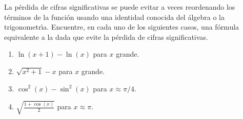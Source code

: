 \begin{enunciado}
 La p\'erdida de cifras significativas se puede evitar a veces reordenando los t\'erminos de la funci\'on usando una identidad conocida del \'algebra o la trigonometr\'{\i}a. Encuentre, en cada uno de los siguientes casos, una f\'ormula equivalente a la dada que evite la p\'erdida de cifras significativas.
 \begin{enumerate}
  \item $\ln(x+1) - \ln(x)$ para $x$ grande.
  
  \item $\sqrt{x^2+1} - x$ para $x$ grande.
  
  \item $\cos^2(x) - \sin^2(x)$ para $x \approx \pi/4$.
  
  \item $\displaystyle{\sqrt{\frac{1+\cos(x)}{2}}}$ para $x \approx \pi$.
 \end{enumerate}
\end{enunciado}

